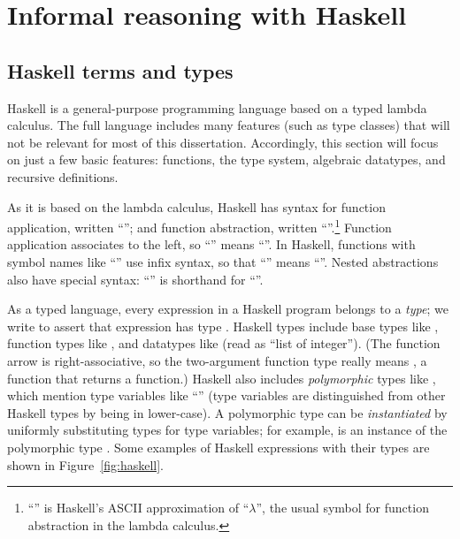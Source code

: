 \section{Informal reasoning with Haskell}
\label{sec:intro-haskell}


\subsection{Haskell terms and types}

Haskell \cite{HaskellReport, Bird1998Introduction} is a general-purpose programming language based on a typed lambda calculus. The full language includes many features (such as type classes) that will not be relevant for most of this dissertation. Accordingly, this section will focus on just a few basic features: functions, the type system, algebraic datatypes, and recursive definitions.

As it is based on the lambda calculus, Haskell has syntax for function application, written ``''; and function abstraction, written ``''.\footnote{``\hs{\textbackslash}'' is Haskell's ASCII approximation of ``$\lambda$'', the usual symbol for function abstraction in the lambda calculus.} Function application associates to the left, so ``'' means ``''. In Haskell, functions with symbol names like ``\hs{(+)}'' use infix syntax, so that ``'' means ``''. Nested abstractions also have special syntax: ``'' is shorthand for ``''.

As a typed language, every expression in a Haskell program belongs to a \emph{type}; we write  to assert that expression  has type . Haskell types include base types like , function types like , and datatypes like \hs{[Integer]} (read as ``list of integer''). (The function arrow is right-associative, so the two-argument function type  really means , a function that returns a function.) Haskell also includes \emph{polymorphic} types like , which mention type variables like ``'' (type variables are distinguished from other Haskell types by being in lower-case). A polymorphic type can be \emph{instantiated} by uniformly substituting types for type variables; for example,  is an instance of the polymorphic type . Some examples of Haskell expressions with their types are shown in Figure~\ref{fig:haskell}.

